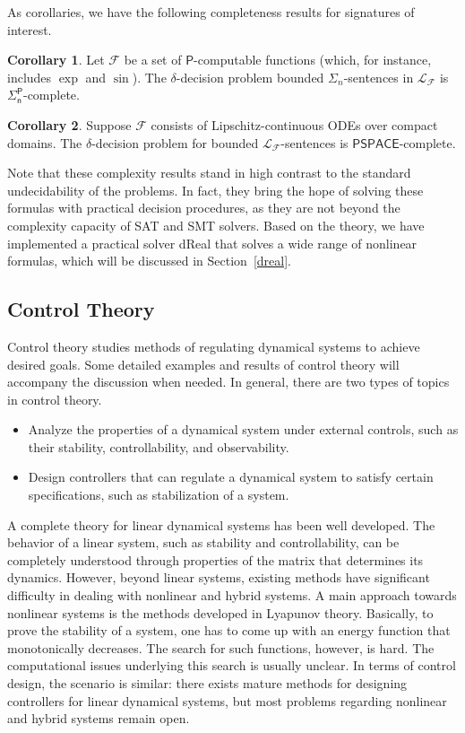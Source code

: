 \documentclass[11pt]{article}
\theoremstyle{definition}
\newtheorem{corollary}{Corollary}[section]
\begin{document}
As corollaries, we have the following completeness results for signatures of interest. 
\begin{corollary}
Let $\mathcal{F}$ be a set of $\mathsf{P}$-computable functions (which, for instance, includes $\exp$ and $\sin$). The $\delta$-decision problem bounded $\Sigma_n$-sentences in $\mathcal{L}_{\mathcal{F}}$ is $\mathsf{\Sigma_n^P}$-complete. 
\end{corollary}
\begin{corollary}
Suppose $\mathcal{F}$ consists of Lipschitz-continuous ODEs over compact domains. The $\delta$-decision problem for bounded $\mathcal{L}_{\mathcal{F}}$-sentences is $\mathsf{PSPACE}$-complete. 
\end{corollary}
Note that these complexity results stand in high contrast to the standard undecidability of the problems. In fact, they bring the hope of solving these formulas with practical decision procedures, as they are not beyond the complexity capacity of SAT and SMT solvers. Based on the theory, we have implemented a practical solver dReal that solves a wide range of nonlinear formulas, which will be discussed in Section~\ref{dreal}. 

\subsection{Control Theory} 

Control theory studies methods of regulating dynamical systems to achieve desired goals. Some detailed examples and results of control theory will accompany the discussion when needed.
In general, there are two types of topics in control theory. 
\begin{itemize}
\item Analyze the properties of a dynamical system under external controls, such as their stability, controllability, and observability. 
\item Design controllers that can regulate a dynamical system to satisfy certain specifications, such as stabilization of a system. 
\end{itemize}

A complete theory for linear dynamical systems has been well developed. The behavior of a linear system, such as stability and controllability, can be completely understood through properties of the matrix that determines its dynamics. However, beyond linear systems, existing methods have significant difficulty in dealing with nonlinear and hybrid systems. A main approach towards nonlinear systems is the methods developed in Lyapunov theory. Basically, to prove the stability of a system, one has to come up with an energy function that monotonically decreases. The search for such functions, however, is hard. The computational issues underlying this search is usually unclear. In terms of control design, the scenario is similar: there exists mature methods for designing controllers for linear dynamical systems, but most problems regarding nonlinear and hybrid systems remain open. 
\end{document}
